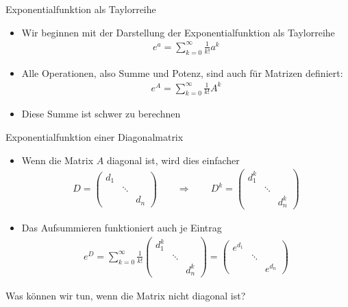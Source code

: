\begin{frame}{Exponentialfunktion als Taylorreihe}
  \begin{itemize}
  \item Wir beginnen mit der Darstellung der Exponentialfunktion als Taylorreihe
    \begin{gather*}
      e^{a} = \sum_{k=0}^\infty \frac1{k!} a^k
    \end{gather*}
  \item Alle Operationen, also Summe und Potenz, sind auch für Matrizen definiert:
    \begin{gather*}
      e^{A} = \sum_{k=0}^\infty \frac1{k!} A^k
    \end{gather*}
  \item Diese Summe ist schwer zu berechnen
  \end{itemize}
\end{frame}


\begin{frame}{Exponentialfunktion einer Diagonalmatrix}
  \begin{itemize}
  \item Wenn die Matrix $A$ diagonal ist, wird dies einfacher
    \begin{gather*}
      D =
      \begin{pmatrix}
        d_1\\ &\ddots\\ &&d_n
      \end{pmatrix}
      \qquad\Rightarrow\qquad
      D^k =
      \begin{pmatrix}
        d_1^k\\ &\ddots\\ &&d_n^k
      \end{pmatrix}
    \end{gather*}
  \item Das Aufsummieren funktioniert auch je Eintrag
    \begin{gather*}
      e^D
      = \sum_{k=0}^\infty \frac1{k!}
      \begin{pmatrix}
        d_{1}^k&\\&\ddots\\&&d_{n}^k
      \end{pmatrix}
      =
      \begin{pmatrix}
        e^{d_1}&\\&\ddots\\&&e^{d_{n}}
      \end{pmatrix}
    \end{gather*}
  \end{itemize}
  \pause
  \begin{Denkpause}
    Was können wir tun, wenn die Matrix nicht diagonal ist?
  \end{Denkpause}
\end{frame}

